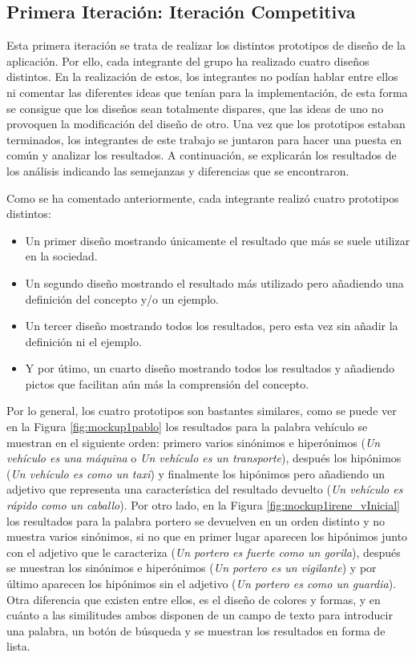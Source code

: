 \subsection{Primera Iteración: Iteración Competitiva}
\label{cap:subsec:iteracionCompetitiva}

Esta primera iteración se trata de realizar los distintos prototipos de diseño de la aplicación. Por ello, cada integrante del grupo ha realizado cuatro diseños distintos. En la realización de estos, los integrantes no podían hablar entre ellos ni comentar las diferentes ideas que tenían para la implementación, de esta forma se consigue que los diseños sean totalmente dispares, que las ideas de uno no provoquen la modificación del diseño de otro.
Una vez que los prototipos estaban terminados, los integrantes de este trabajo se juntaron para hacer una puesta en común y analizar los resultados. A continuación, se explicarán los resultados de los análisis indicando las semejanzas y diferencias que se encontraron.

Como se ha comentado anteriormente, cada integrante realizó cuatro prototipos distintos:
\begin{itemize}
	\item Un primer diseño mostrando únicamente el resultado que más se suele utilizar en la sociedad.
	\item Un segundo diseño mostrando el resultado más utilizado pero añadiendo una definición del concepto y/o un ejemplo.
	\item Un tercer diseño mostrando todos los resultados, pero esta vez sin añadir la definición ni el ejemplo.
	\item Y por útimo, un cuarto diseño mostrando todos los resultados y añadiendo pictos que facilitan aún más la comprensión del concepto.
	
\end{itemize}

Por lo general, los cuatro prototipos son bastantes similares, como se puede ver en la Figura \ref{fig:mockup1pablo} los resultados para la palabra vehículo se muestran en el siguiente orden: primero varios sinónimos e hiperónimos (\textit{Un vehículo es una máquina} o \textit{Un vehículo es un transporte}), después los hipónimos (\textit{Un vehículo es como un taxi}) y finalmente los hipónimos pero añadiendo un adjetivo que representa una característica del resultado devuelto (\textit{Un vehículo es rápido como un caballo}). Por otro lado, en la Figura \ref{fig:mockup1irene_vInicial} los resultados para la palabra portero se devuelven en un orden distinto y no muestra varios sinónimos, si no que en primer lugar aparecen los hipónimos junto con el adjetivo que le caracteriza (\textit{Un portero es fuerte como un gorila}), después se muestran los sinónimos e hiperónimos (\textit{Un portero es un vigilante}) y por último aparecen los hipónimos sin el adjetivo (\textit{Un portero es como un guardia}). Otra diferencia que existen entre ellos, es el diseño de colores y formas, y en cuánto a las similitudes ambos disponen de un campo de texto para introducir una palabra, un botón de búsqueda y se muestran los resultados en forma de lista.

